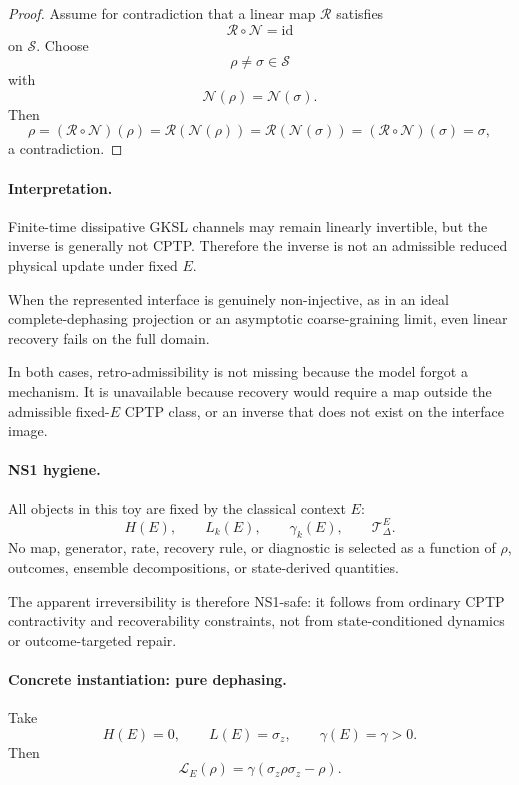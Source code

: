 \documentclass[aps,prx,onecolumn,11pt]{revtex4-2}
\theoremstyle{plain}
\theoremstyle{definition}
\theoremstyle{remark}
\begin{document}
\begin{proof}
Assume for contradiction that a linear map \(\mathcal R\) satisfies
\[
\mathcal R\circ\mathcal N=\mathrm{id}
\]
on \(\mathcal S\). Choose
\[
\rho\neq\sigma\in\mathcal S
\]
with
\[
\mathcal N(\rho)=\mathcal N(\sigma).
\]
Then
\[
\rho
=
(\mathcal R\circ\mathcal N)(\rho)
=
\mathcal R(\mathcal N(\rho))
=
\mathcal R(\mathcal N(\sigma))
=
(\mathcal R\circ\mathcal N)(\sigma)
=
\sigma,
\]
a contradiction.
\end{proof}

\paragraph{Interpretation.}

Finite-time dissipative GKSL channels may remain linearly invertible,
but the inverse is generally not CPTP. Therefore the inverse is not an
admissible reduced physical update under fixed \(E\).

When the represented interface is genuinely non-injective, as in an
ideal complete-dephasing projection or an asymptotic coarse-graining
limit, even linear recovery fails on the full domain.

In both cases, retro-admissibility is not missing because the model
forgot a mechanism. It is unavailable because recovery would require a
map outside the admissible fixed-\(E\) CPTP class, or an inverse that
does not exist on the interface image.

\paragraph{NS1 hygiene.}

All objects in this toy are fixed by the classical context \(E\):
\[
H(E),
\qquad
L_k(E),
\qquad
\gamma_k(E),
\qquad
\mathcal T^E_\Delta.
\]
No map, generator, rate, recovery rule, or diagnostic is selected as a
function of \(\rho\), outcomes, ensemble decompositions, or
state-derived quantities.

The apparent irreversibility is therefore NS1-safe: it follows from
ordinary CPTP contractivity and recoverability constraints, not from
state-conditioned dynamics or outcome-targeted repair.

\paragraph{Concrete instantiation: pure dephasing.}

Take
\[
H(E)=0,
\qquad
L(E)=\sigma_z,
\qquad
\gamma(E)=\gamma>0.
\]
Then
\[
\mathcal L_E(\rho)
=
\gamma(\sigma_z\rho\sigma_z-\rho).
\]
\end{document}
